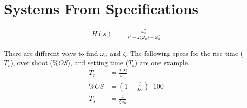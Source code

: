 \documentclass{article}
\newcommand{\sincludepdf}[2][]{
	
}
\begin{document}


\sincludepdf[pages={1},
		pagecommand=\section{Laplace Transform}\subsection*{Example 1}
	]{scan/11211301.pdf}

\section{Systems From Specifications}

\begin{align}
	H(s) &= \frac{\omega_n^2}{s^2 + 2 \zeta \omega_n s + \omega_n^2}
\end{align}

There are different ways to find $\omega_n$ and $\zeta$.
The following specs for the rise time ($T_r$), over shoot ($\%OS$),
and setting time ($T_s$) are one example.
\begin{align*}
	T_r &= \frac{2.22}{\omega_n} \\
	\%OS &= \left( 1 - \frac{\zeta}{0.6} \right) \cdot 100 \\
	T_s &= \frac{4}{\zeta \omega_n}
\end{align*}
\end{document}
